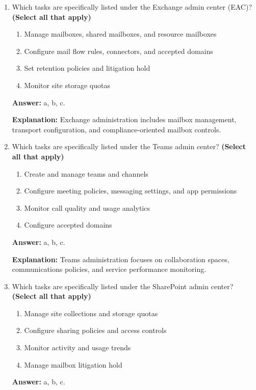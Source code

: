 \documentclass[10pt]{article}
\begin{document}
\begin{enumerate}[leftmargin=*]
\textbf{Answer:} Exchange admin center \textrightarrow{} mail flow rules, connectors, and accepted domains; Teams admin center \textrightarrow{} meeting policies, messaging settings, and app permissions; SharePoint admin center \textrightarrow{} site collections and storage quotas.

\textbf{Explanation:} Each service-specific portal is built around the operational and governance needs of its own workload.

\item Which tasks are specifically listed under the Exchange admin center (EAC)? \textbf{(Select all that apply)}
\begin{enumerate}[label=\alph*., leftmargin=1.5em]
\item Manage mailboxes, shared mailboxes, and resource mailboxes
\item Configure mail flow rules, connectors, and accepted domains
\item Set retention policies and litigation hold
\item Monitor site storage quotas
\end{enumerate}
\textbf{Answer:} a, b, c.

\textbf{Explanation:} Exchange administration includes mailbox management, transport configuration, and compliance-oriented mailbox controls.

\item Which tasks are specifically listed under the Teams admin center? \textbf{(Select all that apply)}
\begin{enumerate}[label=\alph*., leftmargin=1.5em]
\item Create and manage teams and channels
\item Configure meeting policies, messaging settings, and app permissions
\item Monitor call quality and usage analytics
\item Configure accepted domains
\end{enumerate}
\textbf{Answer:} a, b, c.

\textbf{Explanation:} Teams administration focuses on collaboration spaces, communications policies, and service performance monitoring.

\item Which tasks are specifically listed under the SharePoint admin center? \textbf{(Select all that apply)}
\begin{enumerate}[label=\alph*., leftmargin=1.5em]
\item Manage site collections and storage quotas
\item Configure sharing policies and access controls
\item Monitor activity and usage trends
\item Manage mailbox litigation hold
\end{enumerate}
\textbf{Answer:} a, b, c.


\end{enumerate}
\end{document}

